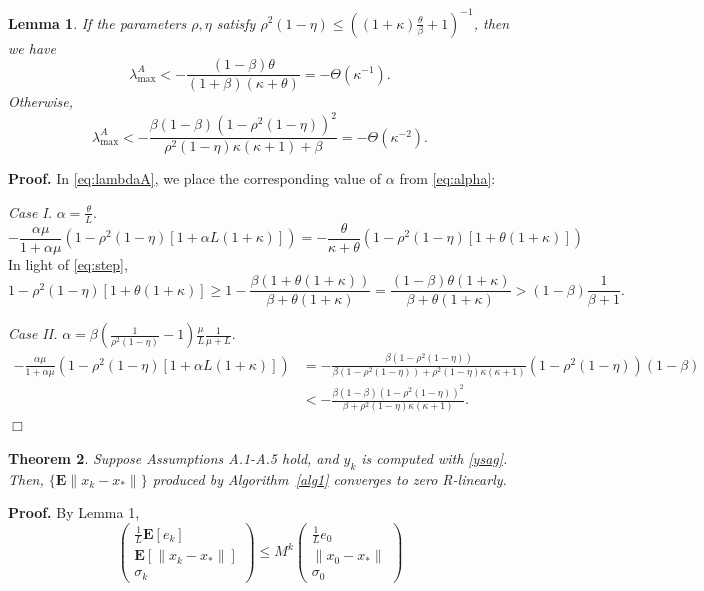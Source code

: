 \documentclass[11pt]{article}
\newtheorem{thm}{Theorem}
\newtheorem{lem}[thm]{Lemma}
\newcommand{\E}{\mathbf{E}}
\begin{document}
\begin{lem}\label{lemma:order}
If the parameters $\rho,\eta$ satisfy $\rho^2(1-\eta) \leq \left((1+\kappa)\frac{\theta}{\beta} + 1\right)^{-1}$, then we have 
\begin{equation}\label{eq:rate1}
\lambda_{\max}^A < -\frac{(1-\beta)\theta}{(1+\beta)(\kappa+\theta)} = -\Theta(\kappa^{-1}).   
\end{equation}
Otherwise, 
\begin{equation}\label{eq:rate2}
 \lambda_{\max}^A < -\frac{\beta(1-\beta)(1-\rho^2(1-\eta))^2}{\rho^2(1-\eta)\kappa(\kappa+1)+\beta} = -\Theta(\kappa^{-2}).
\end{equation}
\end{lem}

\noindent 
\textbf{Proof.} In \eqref{eq:lambdaA}, we place the corresponding value of $\alpha$ from \eqref{eq:alpha}:

\bigskip

\textit{Case I.} $\alpha=\displaystyle\frac{\theta}{L}$. 
\[
 -\frac{\alpha\mu}{1+\alpha\mu}\left(1-\rho^2(1-\eta)[1+\alpha L(1+\kappa)]\right) = -\frac{\theta}{\kappa+\theta}\left(1-\rho^2(1-\eta)[1+\theta(1+\kappa)]\right)
\]
In light of \eqref{eq:step}, 
\[
 1-\rho^2(1-\eta)[1+\theta(1+\kappa)]\geq 1-\frac{\beta(1+\theta(1+\kappa))}{\beta+\theta(1+\kappa)} = \frac{(1-\beta)\theta(1+\kappa)}{\beta+\theta(1+\kappa)}> (1-\beta)\frac{1}{\beta+1}.
\]

\bigskip

\textit{Case II.} $\alpha = \displaystyle\beta\left(\frac{1}{\rho^2(1-\eta)}-1\right)\frac{\mu}{L}\frac{1}{\mu+L}$.
\begin{align*}
 -\frac{\alpha\mu}{1+\alpha\mu}\left(1-\rho^2(1-\eta)[1+\alpha L(1+\kappa)]\right) &= -\frac{\beta(1-\rho^2(1-\eta))}{\beta(1-\rho^2(1-\eta))+\rho^2(1-\eta)\kappa(\kappa+1)}(1-\rho^2(1-\eta))(1-\beta)\\
 & < -\frac{\beta(1-\beta)(1-\rho^2(1-\eta))^2}{\beta+\rho^2(1-\eta)\kappa(\kappa+1)}.
\end{align*}
\hspace*{\fill}$\Box$\medskip

\bigskip

\begin{thm}\label{thm:linear}
 Suppose Assumptions A.1-A.5 hold, and $y_k$ is computed with \eqref{ysag}.  Then, $\{\E\|x_k-x_\ast\|\}$ produced by Algorithm~\ref{alg1} converges to zero R-linearly.
\end{thm}

\noindent 
\textbf{Proof.}  By Lemma 1, 
\begin{equation}\label{eq:control}
 \begin{pmatrix} \frac{1}{L}\E[e_k]\\ \E[\|x_k-x_\ast \|] \\ \sigma_k \end{pmatrix} 
\leq M^k
 \begin{pmatrix} \frac{1}{L}e_0 \\ \| x_0-x_\ast \| \\ \sigma_0 \end{pmatrix} 
\end{equation}
\end{document}

